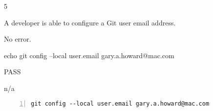 \begin{description}[align=right,leftmargin=3.2cm,labelindent=3.0cm]
\item[Step:] 5
\item[Confirm:] A developer is able to configure a Git user email address.
\item[Expectation:] No error.
\item[Command:] echo git  config --local user.email gary.a.howard@mac.com
\item[Test Result:] PASS
\item[Evidence:] n/a
\end{description}
\begin{lstlisting}[numbers=left]
git config --local user.email gary.a.howard@mac.com

\end{lstlisting}
